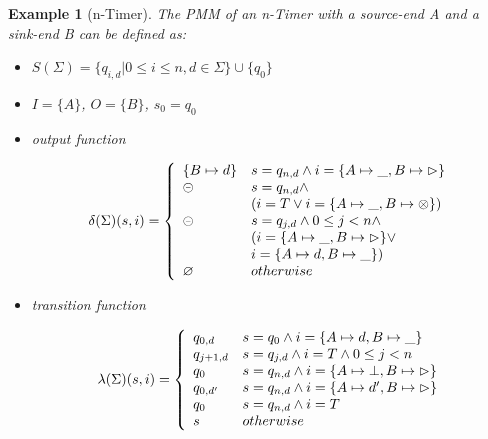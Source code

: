 \documentclass[conference, a4paper]{IEEEtran}
\newtheorem{example}{Example}
\newcommand{\rblock}[0]{\circleddash}
\newcommand{\rread}[0]{\rhd}
\newcommand{\rnoread}[0]{\otimes}
\newcommand{\rempty}[0]{\varnothing}
\begin{document}
\begin{example}[n-Timer]
  The PMM of an n-Timer with a source-end A and a sink-end B can be defined as:
  \begin{itemize}
    \item[-] $S(\Sigma)=\{q_{i,d}|0\leq i\leq n, d\in \Sigma\}\cup\{q_0\}$
    \item[-] $I=\{A\}$, $O=\{B\}$, $s_0=q_0$
    \item[-] output function
      \begin{small}
        \begin{displaymath}
          \delta(\Sigma)(s,i)=\left\{
          \begin{array}[ht]{ll}
            \{B\mapsto d\} & s=q_{n,d}\land i=\{A\mapsto \_,B\mapsto \rread\}\\
            \rblock & s=q_{n,d}\land \\
            & (i=T\lor i=\{A\mapsto \_,B\mapsto \rnoread\}) \\
            \rblock & s=q_{j,d}\land 0 \leq j < n\land \\
            & (i=\{A\mapsto \_,B\mapsto \rread\}\lor \\
            & i=\{A\mapsto d,B\mapsto \_\})\\
            \rempty & otherwise\\
          \end{array}
          \right.
        \end{displaymath} 
      \end{small}
    \item[-] transition function
      \begin{small}
        \begin{displaymath}
          \lambda(\Sigma)(s,i)=\left\{
          \begin{array}[ht]{ll}
            q_{0,d} & s=q_0 \land i=\{A\mapsto d,B\mapsto \_\} \\
            q_{j+1,d} & s=q_{j,d}\land i=T\land0 \leq j < n\\
            q_0 & s=q_{n,d}\land i=\{A\mapsto \bot,B\mapsto \rread\} \\
            q_{0,d'} & s=q_{n,d}\land i=\{A\mapsto d',B\mapsto \rread\} \\
            q_0 & s=q_{n,d} \land i=T \\
            s & otherwise \\
          \end{array}
          \right.
        \end{displaymath}
      \end{small}
  \end{itemize}
\end{example}
\end{document}
